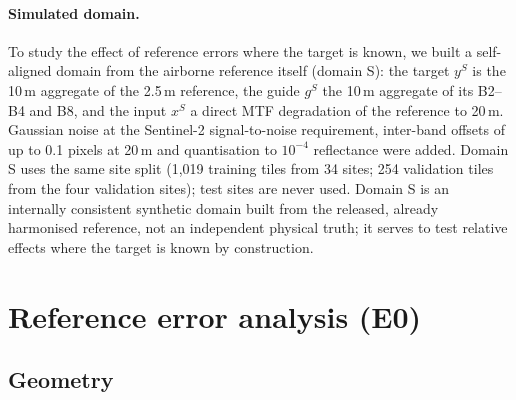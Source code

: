 \documentclass[pdflatex,sn-basic,referee,lineno]{sn-jnl}
\begin{document}
\paragraph{Simulated domain.} To study the effect of reference errors where the target is known, we built a
self-aligned domain from the airborne reference itself (domain S): the target $y^S$ is the 10\,m aggregate of the
2.5\,m reference, the guide $g^S$ the 10\,m aggregate of its B2--B4 and B8, and the input $x^S$ a direct MTF
degradation of the reference to 20\,m. Gaussian noise at the Sentinel-2 signal-to-noise requirement, inter-band
offsets of up to 0.1 pixels at 20\,m and quantisation to $10^{-4}$ reflectance were added. Domain S uses the same
site split (1,019 training tiles from 34 sites; 254 validation tiles from the four validation sites); test sites
are never used. Domain S is an internally consistent synthetic domain built from the released, already harmonised
reference, not an independent physical truth; it serves to test relative effects where the target is known by
construction.

\section{Reference error analysis (E0)}\label{sec:method-errors}

\subsection{Geometry}
\end{document}
